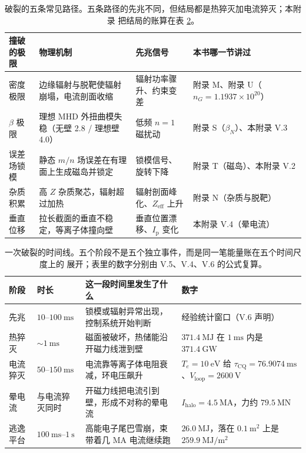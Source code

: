 \begin{table}[htbp]
\centering
\small
\caption{破裂的五条常见路径。五条路径的先兆不同，但结局都是热猝灭加电流猝灭；本附录
把结局的账算在表 \ref{tab:app-v-timeline}。}
\label{tab:app-v-limits}
\begin{tabular}{@{}p{2.6cm}p{3.9cm}p{3.2cm}p{3.4cm}@{}}
\toprule
撞破的极限 & 物理机制 & 先兆信号 & 本书哪一节讲过 \\
\midrule
密度极限 & 边缘辐射与脱靶使辐射崩塌，电流剖面收缩 & 辐射功率骤升、约束变差 & 附录 M、附录 U（$n_G=1.1937\times10^{20}$） \\
$\beta$ 极限 & 理想 MHD 外扭曲模失稳（无壁 2.8 / 理想壁 4.0） & 低频 $n=1$ 磁扰动 & 附录 S（$\beta_N$）、本附录 V.3 \\
误差场锁模 & 静态 $m/n$ 场误差在有理面上生成磁岛并锁定 & 锁模信号、旋转下降 & 附录 T（磁岛）、本附录 V.2 \\
杂质积累 & 高 $Z$ 杂质聚芯，辐射超过加热 & 辐射剖面峰化、$Z_{\mathrm{eff}}$ 上升 & 附录 N（杂质与脱靶） \\
垂直位移 & 拉长截面的垂直不稳定，等离子体撞向壁 & 垂直位置漂移、$I_{\mathrm p}$ 变化 & 本附录 V.4（晕电流） \\
\bottomrule
\end{tabular}

\end{table}

\begin{table}[htbp]
\centering
\small
\caption{一次破裂的时间线。五个阶段不是五个独立事件，而是同一笔能量账在五个时间尺度上的
展开；表里的数字分别由 V.5、V.4、V.6 的公式复算。}
\label{tab:app-v-timeline}
\begin{tabular}{@{}p{2.4cm}p{2.5cm}p{3.8cm}p{4.3cm}@{}}
\toprule
阶段 & 时长 & 这一段时间里发生了什么 & 数字 \\
\midrule
先兆 & $10$--$100\ \mathrm{ms}$ & 锁模或辐射异常出现，控制系统开始判断 & 经验统计窗口（V.6 声明） \\
热猝灭 & $\sim1\ \mathrm{ms}$ & 磁面被破坏，热储能沿开磁力线泄到壁 & $371.4\ \mathrm{MJ}$ 在 $1\ \mathrm{ms}$ 内是 $371.4\ \mathrm{GW}$ \\
电流猝灭 & $50$--$150\ \mathrm{ms}$ & 电流靠等离子体电阻衰减，环电压飙升 & $T_e=10\ \mathrm{eV}$ 给 $\tau_{\mathrm{CQ}}=76.9074\ \mathrm{ms}$、$V_{\mathrm{loop}}=2600\ \mathrm{V}$ \\
晕电流 & 与电流猝灭同时 & 开磁力线把电流引到壁，形成不对称的晕电流 & $I_{\mathrm{halo}}=4.5\ \mathrm{MA}$，力约 $79.5\ \mathrm{MN}$ \\
逃逸平台 & $100\ \mathrm{ms}$--$1\ \mathrm{s}$ & 高能电子尾巴雪崩，束带着几 MA 电流继续跑 & $26.0\ \mathrm{MJ}$，落在 $0.1\ \mathrm{m^2}$ 上是 $259.9\ \mathrm{MJ/m^2}$ \\
\bottomrule
\end{tabular}

\end{table}

